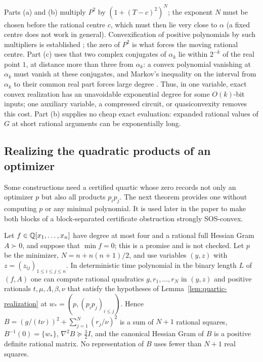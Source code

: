Parts (a) and (b) multiply $P^2$ by $(1+(T-c)^2)^N$; the exponent $N$ must be chosen
before the rational centre $c$, which must then lie very close to $\alpha$
(a fixed centre does not work in general). Convexification of positive
polynomials by such multipliers is established \cite{KurdykaSpodzieja2015};
the zero of $P^2$ is what forces the moving rational centre. Part (c) uses that
two complex
conjugates of $\alpha_k$ lie within $2^{-k}$ of the real point $1$, at distance
more than three from $\alpha_k$: a convex polynomial vanishing at $\alpha_k$
must vanish at these conjugates, and Markov's inequality on the interval
from $\alpha_k$ to their common real part forces large degree
\cite{BorweinErdelyi1995}. Thus, in one variable, exact
convex realization has an unavoidable exponential degree for some
$O(k)$-bit inputs; one auxiliary variable, a compressed circuit, or
quasiconvexity removes this cost. Part (b) supplies no cheap exact evaluation:
expanded rational values of $G$ at short rational arguments can be
exponentially long.

\subsection{Realizing the quadratic products of an optimizer}
\label{sec:algebraic-graph}

Some constructions need a certified quartic whose zero records not only an
optimizer $p$ but also all products $p_ip_j$. The next theorem provides one
without computing $p$ or any minimal polynomial. It is used later in the
paper to make both blocks of a block-separated certificate obstruction
strongly SOS-convex.

\begin{theorem}
\label{thm:quadratic-graph}
Let $f\in\mathbb Q[x_1,\ldots,x_n]$ have degree at most four and a rational full
Hessian Gram $A\succ0$, and suppose that $\min f=0$; this is a promise and is
not checked. Let $p$ be the minimizer, $N=n+n(n+1)/2$, and use variables
$(y,z)$ with $z=(z_{ij})_{1\le i\le j\le n}$. In deterministic time polynomial
in the binary length $L$ of $(f,A)$ one can compute rational quadratics
$g,r_1,\ldots,r_N$ in $(y,z)$ and positive rationals $t,\mu,\Lambda,\beta,\nu$
that satisfy the hypotheses of Lemma~\ref{lem:quartic-realization} at
$w_*=(p,(p_ip_j)_{i\le j})$. Hence $B=(g/(t\nu))^2+\sum_{j=1}^N(r_j/\nu)^2$ is
a sum of $N+1$ rational squares, $B^{-1}(0)=\{w_*\}$,
$\nabla^2B\succeq\tfrac32I$, and the canonical Hessian Gram of $B$ is a
positive definite rational matrix. No representation of $B$ uses fewer than
$N+1$ real squares.
\end{theorem}

